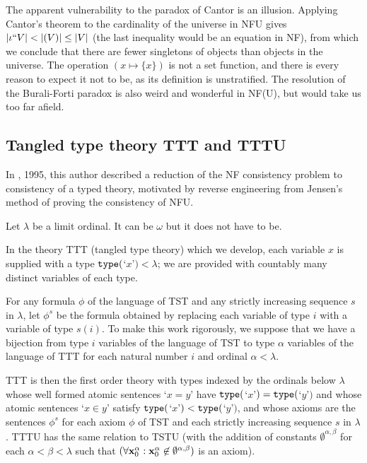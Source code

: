 \documentclass[112pt]{article}
\begin{document}
The apparent vulnerability to the paradox of Cantor is an illusion.  Applying Cantor's theorem to the cardinality of the universe in NFU gives $|\iota``V| < |{\cal }(V)| \leq |V|$ (the last inequality would be an equation in NF), from which we conclude that there are fewer singletons of objects than objects in the universe.  The operation $(x \mapsto \{x\})$ is not a set function, and there is every reason to expect it not to be, as its definition is unstratified.  The resolution of the Burali-Forti paradox is also weird and wonderful in NF(U), but would take us too far afield.

\newpage

\subsection{Tangled type theory TTT and TTTU}

In \cite{tangled}, 1995, this author described a reduction of the NF consistency problem to consistency of a typed theory,  motivated by reverse engineering from Jensen's method of proving the consistency of NFU.

Let $\lambda$ be a limit ordinal.  It can be $\omega$ but it does not have to be.  

In the theory TTT (tangled type theory) which we develop, each variable $x$ is supplied with a type ${\tt type}($`$x$'$) <\lambda$;  we are provided with countably many distinct variables of each type.

For any formula $\phi$ of the language of TST and any strictly increasing sequence $s$ in $\lambda$, let $\phi^s$ be the formula obtained by replacing each variable
of type $i$ with a variable of type $s(i)$.  To make this work rigorously, we suppose that we have a bijection from type $i$ variables of the language of TST to type $\alpha$ variables
of the language of TTT for each natural number $i$ and ordinal $\alpha<\lambda$.

TTT is then the first order theory with types indexed by the ordinals below $\lambda$ whose well formed atomic sentences `$x=y$' have ${\tt type}($`$x$'$) = {\tt type}($`$y$'$)$ and whose atomic sentences `$x \in y$' satisfy ${\tt type}($`$x$'$) < {\tt type}($`$y$'$)$, and whose axioms are the sentences $\phi^s$ for each axiom $\phi$ of TST and each strictly increasing sequence $s$ in $\lambda$.  TTTU has the same relation to TSTU (with the addition of constants $\emptyset^{\alpha,\beta}$ for each $\alpha<\beta<\lambda$  such that $(\forall {\bf x}_0^{\alpha} :{\bf x}_0^{\alpha}\not\in \emptyset^{\alpha,\beta})$ is an axiom).
\end{document}
